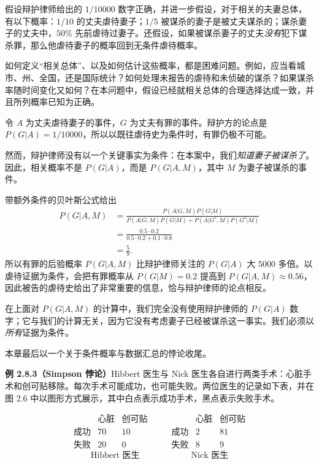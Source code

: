 \documentclass[UTF8,12pt,a4paper,fontset=fandol]{ctexart}
\begin{document}
假设辩护律师给出的 $1/10000$ 数字正确，并进一步假设，对于相关的夫妻总体，有以下概率：$1/10$ 的丈夫虐待妻子；$1/5$ 被谋杀的妻子是被丈夫谋杀的；谋杀妻子的丈夫中，$50\%$ 先前虐待过妻子。还假设，如果被谋杀妻子的丈夫\textit{没有}犯下谋杀罪，那么他虐待妻子的概率回到无条件虐待概率。

如何定义“相关总体”、以及如何估计这些概率，都是困难问题。例如，应当看城市、州、全国，还是国际统计？如何处理未报告的虐待和未侦破的谋杀？如果谋杀率随时间变化又如何？在本问题中，假设已经就相关总体的合理选择达成一致，并且所列概率已知为正确。

令 $A$ 为丈夫虐待妻子的事件，$G$ 为丈夫有罪的事件。辩护方的论点是 $P(G|A)=1/10000$，所以以既往虐待史为条件时，有罪仍极不可能。

然而，辩护律师没有以一个关键事实为条件：在本案中，我们\textit{知道妻子被谋杀了}。因此，相关概率不是 $P(G|A)$，而是 $P(G|A,M)$，其中 $M$ 为妻子被谋杀的事件。

带额外条件的贝叶斯公式给出
\[
\begin{aligned}
  P(G|A,M)
  &=
  \frac{P(A|G,M)P(G|M)}
       {P(A|G,M)P(G|M)+P(A|G^c,M)P(G^c|M)}\\
  &=
  \frac{0.5\cdot 0.2}{0.5\cdot 0.2+0.1\cdot 0.8}\\
  &=
  \frac59.
\end{aligned}
\]
所以有罪的后验概率 $P(G|A,M)$ 比辩护律师关注的 $P(G|A)$ 大 $5000$ 多倍。以虐待证据为条件，会把有罪概率从 $P(G|M)=0.2$ 提高到 $P(G|A,M)\approx 0.56$，因此被告的虐待史给出了非常重要的信息，恰与辩护律师的论点相反。

在上面对 $P(G|A,M)$ 的计算中，我们完全没有使用辩护律师的 $P(G|A)$ 数字；它与我们的计算无关，因为它没有考虑妻子已经被谋杀这一事实。我们必须以\textit{所有}证据为条件。

本章最后以一个关于条件概率与数据汇总的悖论收尾。

\noindent\textbf{例 2.8.3（Simpson 悖论）}\quad Hibbert 医生与 Nick 医生各自进行两类手术：心脏手术和创可贴移除。每次手术可能成功，也可能失败。两位医生的记录如下表，并在图 2.6 中以图形方式展示，其中白点表示成功手术，黑点表示失败手术。

\[
\begin{array}{c|cc}
 & \text{心脏} & \text{创可贴}\\
\hline
\text{成功} & 70 & 10\\
\text{失败} & 20 & 0
\end{array}
\qquad
\begin{array}{c|cc}
 & \text{心脏} & \text{创可贴}\\
\hline
\text{成功} & 2 & 81\\
\text{失败} & 8 & 9
\end{array}
\]
\[
  \text{Hibbert 医生}
  \qquad\qquad\qquad
  \text{Nick 医生}
\]
\end{document}
